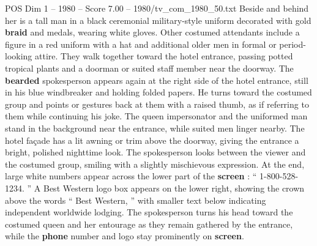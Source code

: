 \begin{textsample}{POS Dim 1 – 1980 – Score 7.00 – 1980/tv\_com\_1980\_50.txt}
Beside and behind her is a tall man in a black ceremonial military-style uniform decorated with gold \textbf{braid} and medals, wearing white gloves.
Other costumed attendants include a figure in a red uniform with a hat and additional older men in formal or period-looking attire.
They walk together toward the hotel entrance, passing potted tropical plants and a doorman or suited staff member near the doorway.
The \textbf{bearded} spokesperson appears again at the right side of the hotel entrance, still in his blue windbreaker and holding folded papers.
He turns toward the costumed group and points or gestures back at them with a raised thumb, as if referring to them while continuing his joke.
The queen impersonator and the uniformed man stand in the background near the entrance, while suited men linger nearby.
The hotel façade has a lit awning or trim above the doorway, giving the entrance a bright, polished nighttime look.
The spokesperson looks between the viewer and the costumed group, smiling with a slightly mischievous expression.
At the end, large white numbers appear across the lower part of the \textbf{screen} : “ 1-800-528-1234. ” A Best Western logo box appears on the lower right, showing the crown above the words “ Best Western, ” with smaller text below indicating independent worldwide lodging.
The spokesperson turns his head toward the costumed queen and her entourage as they remain gathered by the entrance, while the \textbf{phone} number and logo stay prominently on \textbf{screen}.

\end{textsample}
